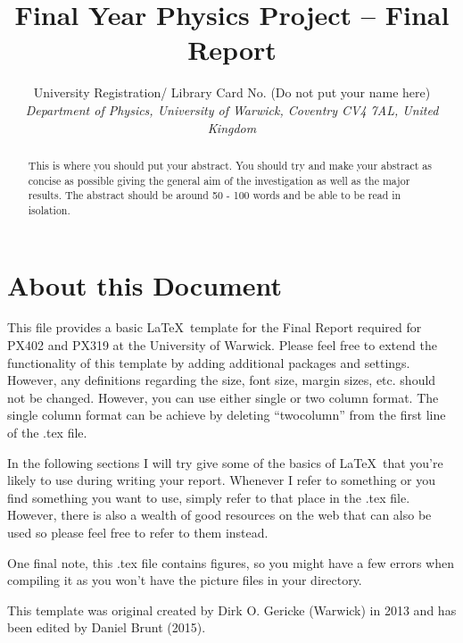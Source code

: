 \documentclass[a4paper,12pt, onecolumn, notitlepage]{article}
\begin{document}
\title{\textbf{\large{Final Year Physics Project – Final Report}}}

\author{\normalsize{University Registration/ Library Card No. (Do not put your name here)} \\
        \small\textit{
        Department of Physics, University of Warwick,
        Coventry CV4 7AL, United Kingdom}}
\date{}
\maketitle 
\vspace{-10mm}
\begin{abstract} 
\noindent
This is where you should put your abstract. You should try and make your abstract as concise as possible giving the general aim of the investigation as well as the major results. The abstract should be around 50 - 100 words and be able to be read in isolation.  
\end{abstract}
\vspace{11mm}


\section{About this Document}
This file provides a basic \LaTeX\ template for the Final Report required for PX402 and PX319 at the University of Warwick. Please feel free to extend the functionality of this template by adding additional packages and settings. However, any definitions regarding the size, font size, margin sizes, etc. should not be changed. However, you can use either single or two column format. The single column format can be achieve by deleting ``twocolumn'' from the first line of the .tex file.

In the following sections I will try give some of the basics of \LaTeX\ that you're likely to use during writing your report. Whenever I refer to something or you find something you want to use, simply refer to that place in the .tex file. However, there is also a wealth of good resources on the web that can also be used so please feel free to refer to them instead.

One final note, this .tex file contains figures, so you might have a few errors when compiling it as you won't have the  picture files in your directory.  

This template was original created by Dirk O. Gericke (Warwick) in 2013 and has been edited by Daniel Brunt (2015). 
\end{document}
